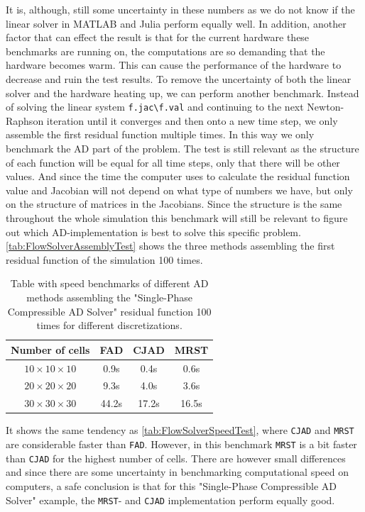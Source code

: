 It is, although, still some uncertainty in these numbers as we do not know if the linear solver in MATLAB and Julia perform equally well. In addition, another factor that can effect the result is that for the current hardware these benchmarks are running on, the computations are so demanding that the hardware becomes warm. This can cause the performance of the hardware to decrease and ruin the test results. To remove the uncertainty of both the linear solver and the hardware heating up, we can perform another benchmark. Instead of solving the linear system \texttt{f.jac\textbackslash f.val} and continuing to the next Newton-Raphson iteration until it converges and then onto a new time step, we only assemble the first residual function multiple times. In this way we only benchmark the AD part of the problem. The test is still relevant as the structure of each function will be equal for all time steps, only that there will be other values. And since the time the computer uses to calculate the residual function value and Jacobian will not depend on what type of numbers we have, but only on the structure of matrices in the Jacobians. Since the structure is the same throughout the whole simulation this benchmark will still be relevant to figure out which AD-implementation is best to solve this specific problem. \autoref{tab:FlowSolverAssemblyTest} shows the three methods assembling the first residual function of the simulation 100 times.
\begin{table}[htb]
    \centering
    \caption{Table with speed benchmarks of different AD methods assembling the "Single-Phase Compressible AD Solver" residual function 100 times for different discretizations.}
    \label{tab:FlowSolverAssemblyTest}
    \def\arraystretch{1.5}
    \begin{tabular}{cccc}
    \textbf{Number of cells} & \textbf{FAD} & \textbf{CJAD} & \textbf{MRST}\\
        \hline
         $10\times10\times10$ & 0.9s & 0.4s & 0.6s  \\  
         $20\times20\times20$ & 9.3s & 4.0s & 3.6s \\ 
         $30\times30\times30$ & 44.2s& 17.2s& 16.5s \\ \hline
    \end{tabular}
\end{table}
It shows the same tendency as \autoref{tab:FlowSolverSpeedTest}, where \texttt{CJAD} and \texttt{MRST} are considerable faster than \texttt{FAD}. However, in this benchmark \texttt{MRST} is a bit faster than \texttt{CJAD} for the highest number of cells. There are however small differences and since there are some uncertainty in benchmarking computational speed on computers, a safe conclusion is that for this "Single-Phase Compressible AD Solver" example, the \texttt{MRST}- and \texttt{CJAD} implementation perform equally good.


